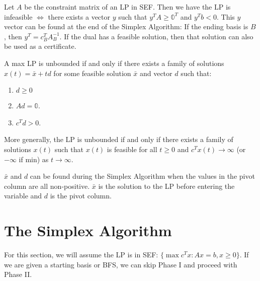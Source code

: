 \documentclass[a4paper]{report}
\begin{document}
\begin{definition}\label{infeasibility}
  Let $A$ be the constraint matrix of an LP in SEF. Then we have the LP is infeasible $\Longleftrightarrow$ there exists a vector $y$ such that $y^T A \geq \mathbb 0^T$ and $y^T b < 0$. This $y$ vector can be found at the end of the Simplex Algorithm: If the ending basis is $B$, then $y^T = c_B^T A_B^{-1}$. If the dual has a feasible solution, then that solution can also be used as a certificate.
\end{definition}

\begin{definition}\label{unboundedness}
  A max LP is unbounded if and only if there exists a family of solutions $x(t) = \bar x + td$ for some feasible solution $\bar x$ and vector $d$ such that:
  \begin{enumerate}
    \item $d \geq 0$
    \item $Ad = \mathbb 0$.
    \item $c^T d > 0$.
  \end{enumerate}

  More generally, the LP is unbounded if and only if there exists a family of solutions $x(t)$ such that $x(t)$ is feasible for all $t \geq 0$ and $c^Tx(t) \rightarrow \infty$ (or $-\infty$ if min) as $t \rightarrow \infty$.
  
  $\bar x$ and $d$ can be found during the Simplex Algorithm when the values in the pivot column are all non-positive. $\bar x$ is the solution to the LP before entering the variable and $d$ is the pivot column.
\end{definition}

\section{The Simplex Algorithm}
For this section, we will assume the LP is in SEF: $\{\max c^T x : Ax = b, x \geq 0\}$. If we are given a starting basis or BFS, we can skip Phase I and proceed with Phase II. 
\end{document}
